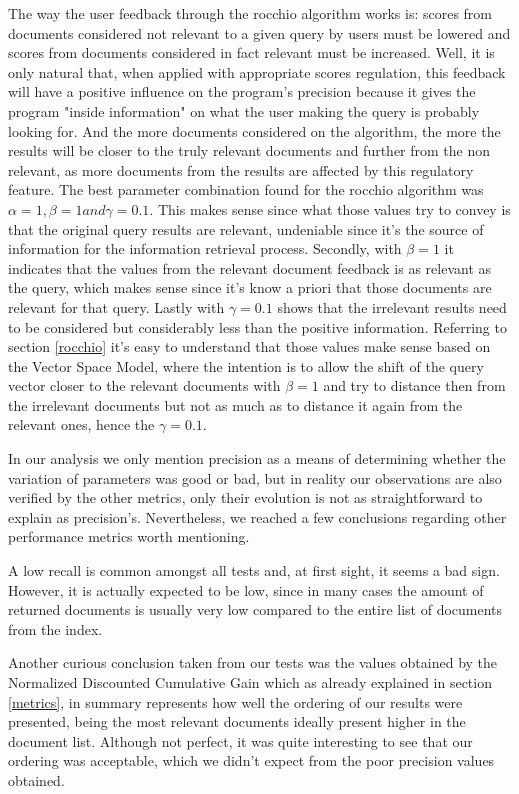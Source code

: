 \documentclass[12pt]{article}
\begin{document}
The way the user feedback through the rocchio algorithm works is: scores from 
documents considered not relevant to a given query by users must be lowered and 
scores from documents considered in fact relevant must be increased.
Well, it is only natural that, when applied with appropriate scores regulation,
this feedback will have a positive influence on the program's precision because
it gives the program "inside information" on what the user making the query is
probably looking for.
And the more documents considered on the algorithm, the more the results will 
be closer to the truly relevant documents and further from the non relevant, as 
more documents from the results are affected by this regulatory feature.
The best parameter combination found for the rocchio algorithm was $\alpha=1, \beta=1 and \gamma=0.1$. This makes sense since what those values try to convey is that the original query results are relevant, undeniable since it's the source of information for the information retrieval process. Secondly,  with $\beta=1$ it indicates that the values from the relevant document feedback is as relevant as the query, which makes sense since it's know a priori that those documents are relevant for that query. Lastly with $\gamma=0.1$ shows that the irrelevant results need to be considered but considerably less than the positive information.
Referring to section \ref{rocchio} it's easy to understand that those values make sense based on the Vector Space Model, where the intention is to allow the shift of the query vector closer to the relevant documents with $\beta=1$ and try to distance then from the irrelevant documents but not as much as to distance it again from the relevant ones, hence the $\gamma=0.1$.

In our analysis we only mention precision as a means of determining whether 
the variation of parameters was good or bad, but in reality our observations 
are also verified by the other metrics, only their evolution is not as 
straightforward to explain as precision's.
Nevertheless, we reached a few conclusions regarding other performance metrics
worth mentioning.

A low recall is common amongst all tests and, at first sight, it seems a bad sign.
However, it is actually expected to be low, since in many cases the amount of returned documents
is usually very low compared to the entire list of documents from the index.

Another curious conclusion taken from our tests was the values obtained by the Normalized Discounted Cumulative Gain which as already explained in section \ref{metrics}, in summary represents how well the ordering of our results were presented, being the most relevant documents ideally present higher in the document list. Although not perfect, it was quite interesting to see that our ordering was acceptable, which we didn't expect from the poor precision values obtained.
\end{document}
